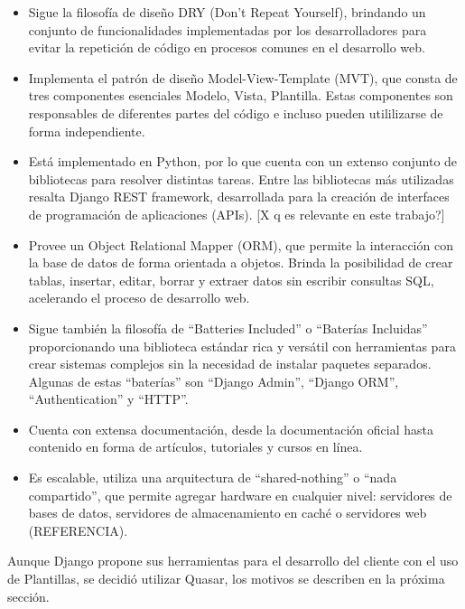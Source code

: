 \begin{itemize}
    \item Sigue la filosofía
    de diseño DRY (Don't Repeat Yourself), brindando un conjunto de funcionalidades implementadas
    por los desarrolladores para evitar la repetición de código en procesos
    comunes en el desarrollo web.
    \item Implementa el patrón de diseño Model-View-Template (MVT), que
    consta de tres componentes esenciales Modelo, Vista,
    Plantilla. Estas componentes son responsables de diferentes
    partes del código e incluso pueden utililizarse de forma independiente.
    \item Está implementado en Python, por lo que cuenta con un 
    extenso conjunto de bibliotecas para resolver distintas tareas. Entre
    las bibliotecas más utilizadas resalta Django REST framework, desarrollada 
    para la creación de interfaces de programación de aplicaciones (APIs).
    [X q es relevante en este trabajo?]
    \item Provee un Object Relational Mapper (ORM), 
    que permite la interacción con la base de datos
    de forma orientada a objetos. Brinda la posibilidad de crear tablas, insertar,
    editar, borrar y extraer datos sin escribir consultas SQL, acelerando el proceso
    de desarrollo web. 
    \item Sigue también la filosofía de ``Batteries Included'' o ``Baterías Incluidas''
    proporcionando una biblioteca estándar rica y versátil con herramientas para
    crear sistemas complejos sin la necesidad de instalar paquetes separados. Algunas de 
    estas ``baterías'' son ``Django Admin'', ``Django ORM'', ``Authentication'' y
    ``HTTP''.
    \item Cuenta con extensa documentación, desde la documentación oficial hasta 
    contenido en forma de artículos, tutoriales y cursos en línea.
    \item Es escalable, utiliza una arquitectura de ``shared-nothing'' o ``nada compartido'',
    que permite agregar hardware en cualquier nivel: servidores de bases de datos,
    servidores de almacenamiento en caché o servidores web (REFERENCIA).

\end{itemize}

 
Aunque Django propone sus herramientas para el desarrollo del cliente con el uso 
de Plantillas, se decidió utilizar Quasar, los motivos se describen en la próxima sección.



